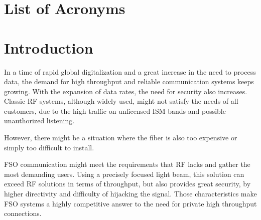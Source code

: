 \documentclass[master,oneside,en,oldtitlepage]{dyplompwr}
\begin{document}




\newpage

\tableofcontents

\chapter{List of Acronyms}
\begin{acronym}[FOUR]\itemsep=-5pt
    
\end{acronym}



\chapter{Introduction}
In a time of rapid global digitalization and a great increase in the need to process data, the demand for high throughput and reliable communication systems keeps growing.
With the expansion of data rates, the need for security also increases. 
Classic \ac{RF} systems, although widely used, might not satisfy the needs of all customers, due to the high traffic on unlicensed \ac{ISM} bands and possible unauthorized listening.

However, there might be a situation where the fiber is also too expensive or simply too difficult to install.

\ac{FSO} communication might meet the requirements that RF lacks and gather the most demanding users. 
Using a precisely focused light beam, this solution can exceed RF solutions in terms of throughput, but also provides great security, by higher directivity and  difficulty of hijacking the signal. Those characteristics make FSO systems a highly competitive answer to the need for private high throughput connections\cite{trichili2020roadmap}. 
\end{document}
